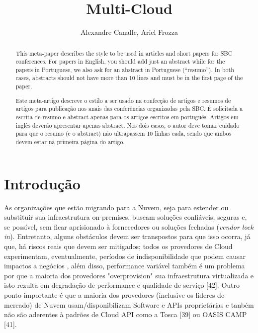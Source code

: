 \documentclass[12pt]{article}
\title{Multi-Cloud}
\author{Alexandre Canalle\inst{1}, Ariel Frozza\inst{1}}
\begin{document}

\singlespacing

\maketitle
	
\begin{abstract}
	This meta-paper describes the style to be used in articles and short papers
	for SBC conferences. For papers in English, you should add just an abstract
	while for the papers in Portuguese, we also ask for an abstract in
	Portuguese (``resumo''). In both cases, abstracts should not have more than
	10 lines and must be in the first page of the paper.
\end{abstract}

\begin{abstract} 
	Este meta-artigo descreve o estilo a ser usado na confecção de artigos e
	resumos de artigos para publicação nos anais das conferências organizadas
	pela SBC. É solicitada a escrita de resumo e abstract apenas para os artigos
	escritos em português. Artigos em inglês deverão apresentar apenas abstract.
	Nos dois casos, o autor deve tomar cuidado para que o resumo (e o abstract)
	não ultrapassem 10 linhas cada, sendo que ambos devem estar na primeira
	página do artigo.
\end{abstract}

	\section{Introdução}
		As organizações que estão migrando para a Nuvem, seja para estender ou substituir sua infraestrutura on-premises, buscam soluções confiáveis, seguras e, se possível, sem ficar aprisionado à fornecedores ou soluções fechadas (\textit{vendor lock in}). Entretanto, alguns obstáculos devem ser transpostos para que isso ocorra, já que, há riscos reais que devem ser mitigados; todos os provedores de Cloud experimentam, eventualmente, períodos de indisponibilidade que podem causar impactos a negócios \cite{01}, além disso,  performance variável também é um problema por que a maioria dos provedores "overprovision" sua infraestrutura virtualizada e isto rezulta em degradação de performance e qualidade de serviço [42]. Outro ponto importante é que a maioria dos provedores (inclusive os lideres de mercado) de Nuvem usam/disponibilizam Software e APIs proprietárias e tanbém não são aderentes à padrões de Cloud API como a Tosca [39] ou OASIS CAMP [41].
		
\end{document}

